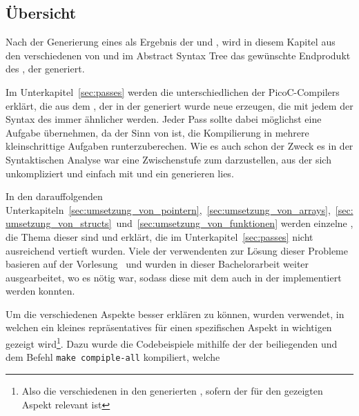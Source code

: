 \subsection{Übersicht}

Nach der Generierung eines  als Ergebnis der  und , wird in diesem Kapitel aus den verschiedenen  von  und  im Abstract Syntax Tree das gewünschte Endprodukt des , der  generiert.

Im Unterkapitel~\ref{sec:passes} werden die unterschiedlichen  der PicoC-Compilers erklärt, die aus dem , der in der  generiert wurde neue  erzeugen, die mit jedem  der Syntax des  immer ähnlicher werden. Jeder Pass sollte dabei möglichst eine Aufgabe übernehmen, da der Sinn von  ist, die Kompilierung in mehrere kleinschrittige Aufgaben runterzuberechen. Wie es auch schon der Zweck es  in der Syntaktischen Analyse war eine Zwischenstufe zum  darzustellen, aus der sich unkompliziert und einfach mit  und  ein  generieren lies.

In den darauffolgenden Unterkapiteln~\ref{sec:umsetzung_von_pointern},~\ref{sec:umsetzung_von_arrays},~\ref{sec:umsetzung_von_structs}~und~\ref{sec:umsetzung_von_funktionen} werden einzelne , die Thema dieser  sind  und erklärt, die im Unterkapitel~\ref{sec:passes} nicht ausreichend vertieft wurden. Viele der verwendenten  zur Lösung dieser Probleme basieren auf der Vorlesung~\cite{scholl_betriebssysteme_2020} und wurden in dieser Bachelorarbeit weiter ausgearbeitet, wo es nötig war, sodass diese mit dem  auch in der  implementiert werden konnten.

Um die verschiedenen Aspekte besser erklären zu können, wurden  verwendet, in welchen ein kleines repräsentatives  für einen spezifischen Aspekt in wichtigen  gezeigt wird\footnote{Also die verschiedenen in den  generierten , sofern der  für den gezeigten Aspekt relevant ist}. Dazu wurde die Codebeispiele mithilfe der der beiliegenden  und dem Befehl \texttt{make compiple-all} kompiliert, welche

